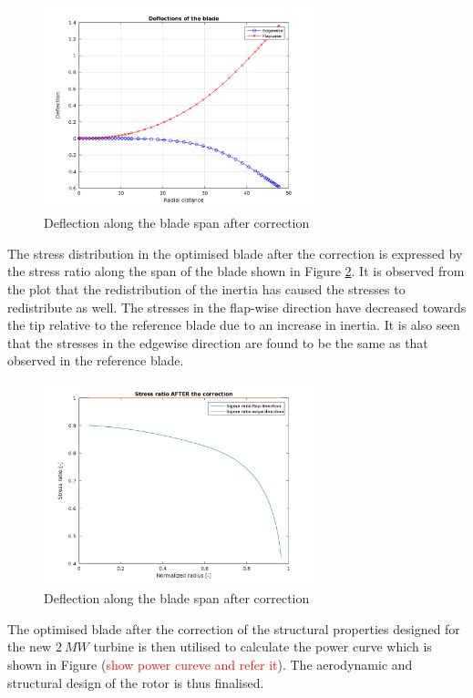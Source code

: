 \begin{figure}[H]
\centering
\includegraphics[width=0.7\textwidth]{Images/deflection_optimal_corrected.png} 
\caption{Deflection along the blade span after correction}
\label{fig:deflection_after}
\end{figure}

The stress distribution in the optimised blade after the correction is expressed by the stress ratio along the span of the blade shown in Figure \ref{fig:stress_ratio_after}. It is observed from the plot that the redistribution of the inertia has caused the stresses to redistribute as well. The stresses in the flap-wise direction have decreased towards the tip relative to the reference blade due to an increase in inertia. It is also seen that the stresses in the edgewise direction are found to be the same as that observed in the reference blade.

\begin{figure}[H]
\centering
\includegraphics[width=0.7\textwidth]{Images/sigma_ratio_after.png} 
\caption{Deflection along the blade span after correction}
\label{fig:stress_ratio_after}
\end{figure}

The optimised blade after the correction of the structural properties designed for the new $2\ MW$ turbine is then utilised to calculate the power curve which is shown in Figure (\textcolor{red}{show power cureve and refer it}). The aerodynamic and structural design of the rotor is thus finalised. 